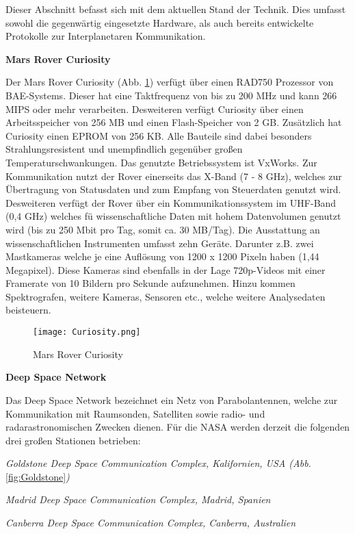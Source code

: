 \label{cap:standDerTechnik}
Dieser Abschnitt befasst sich mit dem aktuellen Stand der Technik. Dies umfasst
sowohl die gegenw{\"a}rtig eingesetzte Hardware, als auch bereits
entwickelte Protokolle zur Interplanetaren Kommunikation.


\textbf{Mars Rover Curiosity}

Der Mars Rover Curiosity (Abb. \ref{fig:Curiosity}) verf{\"u}gt {\"u}ber einen
RAD750 Prozessor von BAE-Systems.
Dieser hat eine Taktfrequenz von bis zu 200 MHz und kann 266 MIPS oder mehr
verarbeiten. Desweiteren verf{\"u}gt Curiosity {\"u}ber einen Arbeitsspeicher von 256 MB
und einen Flash-Speicher von 2 GB. Zus{\"a}tzlich hat Curiosity einen EPROM von 256
KB. Alle Bauteile sind dabei besonders Strahlungsresistent und unempfindlich
gegen{\"u}ber gro{\ss}en Temperaturschwankungen. Das genutzte Betriebssystem ist
VxWorks. Zur Kommunikation nutzt der Rover
einerseits das X-Band (7 - 8 GHz), welches zur {\"U}bertragung von Statusdaten
und zum Empfang von Steuerdaten genutzt wird. Desweiteren verf{\"u}gt der Rover
{\"u}ber ein Kommunikationssystem im UHF-Band (0,4 GHz) welches f{\"u}
wissenschaftliche Daten mit hohem Datenvolumen genutzt wird (bis zu 250 Mbit
pro Tag, somit ca. 30 MB/Tag). Die Ausstattung an wissenschaftlichen
Instrumenten umfasst zehn Ger{\"a}te. Darunter z.B. zwei Mastkameras welche je
eine Aufl{\"o}sung von 1200 x 1200 Pixeln haben (1,44 Megapixel). Diese Kameras
sind ebenfalls in der Lage 720p-Videos mit einer Framerate von 10 Bildern pro
Sekunde aufzunehmen. Hinzu kommen Spektrografen, weitere Kameras, Sensoren etc.,
welche weitere Analysedaten beisteuern.

\begin{figure}[H]
\centering
\texttt{[image: Curiosity.png]}
\caption{Mars Rover Curiosity}
\label{fig:Curiosity}
\end{figure}

\textbf{Deep Space Network}

Das Deep Space Network bezeichnet ein Netz von Parabolantennen, welche zur
Kommunikation mit Raumsonden, Satelliten sowie radio-
und radarastronomischen Zwecken dienen. F{\"u}r die NASA werden derzeit die
folgenden drei gro{\ss}en Stationen betrieben:

\begin{compactenum}[a)]
\item \textit{Goldstone Deep Space Communication Complex, Kalifornien, USA
(Abb.} \ref{fig:Goldstone}\textit{)}
\item \textit{Madrid Deep Space Communication Complex, Madrid, Spanien}
\item \textit{Canberra Deep Space Communication Complex, Canberra, Australien}
\end{compactenum}

